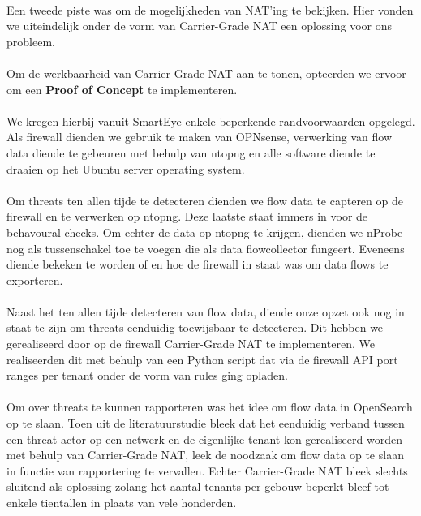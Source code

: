 \paragraph{}
Een tweede piste was om de mogelijkheden van NAT’ing te bekijken. Hier vonden we uiteindelijk onder de vorm van Carrier-Grade NAT een oplossing voor ons probleem.

\paragraph{}
Om de werkbaarheid van Carrier-Grade NAT aan te tonen, opteerden we ervoor om een \textbf{Proof of Concept} te implementeren.

\paragraph{}
We kregen hierbij vanuit SmartEye enkele beperkende randvoorwaarden opgelegd. Als firewall dienden we gebruik te maken van OPNsense, verwerking van flow data diende te gebeuren met behulp van ntopng en alle software diende te draaien op het Ubuntu server operating system.

\paragraph{}
Om threats ten allen tijde te detecteren dienden we flow data te capteren op de firewall en te verwerken op ntopng. Deze laatste staat immers in voor de behavoural checks. Om echter de data op ntopng te krijgen, dienden we nProbe nog als tussenschakel toe te voegen die als data flowcollector fungeert. Eveneens diende bekeken te worden of en hoe de firewall in staat was om data flows te exporteren.

\paragraph{}
Naast het ten allen tijde detecteren van flow data, diende onze opzet ook nog in staat te zijn om threats eenduidig toewijsbaar te detecteren. Dit hebben we gerealiseerd door op de firewall Carrier-Grade NAT te implementeren. We realiseerden dit met behulp van een Python script dat via de firewall API port ranges per tenant onder de vorm van rules ging opladen.

\paragraph{}
Om over threats te kunnen rapporteren was het idee om flow data in OpenSearch op te slaan. Toen uit de literatuurstudie bleek dat het eenduidig verband tussen een threat actor op een netwerk en de eigenlijke tenant kon gerealiseerd worden met behulp van Carrier-Grade NAT, leek de noodzaak om flow data op te slaan in functie van rapportering te vervallen. Echter Carrier-Grade NAT bleek slechts sluitend als oplossing zolang het aantal tenants per gebouw beperkt bleef tot enkele tientallen in plaats van vele honderden.